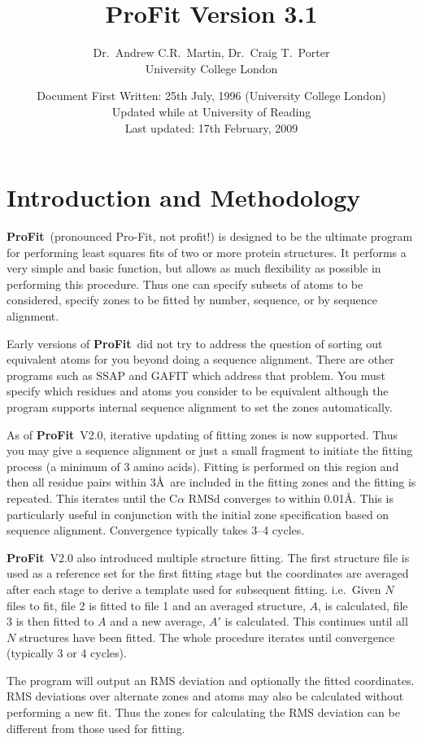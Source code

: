\documentclass{article}
\title{ProFit Version 3.1}
\author{Dr.\ Andrew C.R.\ Martin, Dr.\ Craig T.\ Porter\\ University College London}
\date{Document First Written: 25th July, 1996 (University College %
London)\\%
Updated while at University of Reading\\%
Last updated: 17th February, 2009}
\newcommand{\pf}{\mbox{\bfseries ProFit}}
\begin{document}
\maketitle

\section{Introduction and Methodology}

\pf\ (pronounced Pro-Fit, not profit!) is designed to be the ultimate
program for performing least squares fits of two or more protein
structures. It performs a very simple and basic function, but allows
as much flexibility as possible in performing this procedure. Thus one
can specify subsets of atoms to be considered, specify zones to be
fitted by number, sequence, or by sequence alignment.

Early versions of \pf\ did not try to address the question of sorting out 
equivalent
atoms for you beyond doing a sequence alignment. There are other
programs such as SSAP and GAFIT which address that problem. You must
specify which residues and atoms you consider to be equivalent
although the program supports internal sequence alignment to set the
zones automatically.

As of \pf\ V2.0, iterative updating of fitting zones is now
supported. Thus you may give a sequence alignment or just a small fragment 
to initiate the
fitting process (a minimum of 3 amino acids). Fitting is performed on
this region and then all residue pairs within 3\AA\ are included in
the fitting zones and the fitting is repeated. This iterates until the
C$\alpha$ RMSd converges to within 0.01\AA. This is particularly
useful in conjunction with the initial zone specification based on
sequence alignment. Convergence typically takes 3--4 cycles.

\pf\ V2.0 also introduced multiple structure fitting. The first
structure file is used as a reference set for the first fitting stage
but the coordinates are averaged after each stage to derive a template
used for subsequent fitting. i.e.\ Given $N$ files to fit, file 2 is
fitted to file 1 and an averaged structure, $A$, is calculated, file 3
is then fitted to $A$ and a new average, $A'$ is calculated. This
continues until all $N$ structures have been fitted. The whole
procedure iterates until convergence (typically 3 or 4 cycles).

The program will output an RMS deviation and optionally the fitted
coordinates.  RMS deviations over alternate zones and atoms may also
be calculated without performing a new fit. Thus the zones for
calculating the RMS deviation can be different from those used for
fitting.
\end{document}
